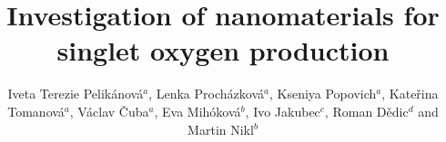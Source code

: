 \begin{frontmatter}



\title{Investigation of nanomaterials for singlet oxygen production}


\author{Iveta Terezie Pelikánová$^{a}$, Lenka Procházková$^{a}$, Kseniya Popovich$^{a}$, Kateřina Tomanová$^{a}$, Václav Čuba$^{a}$, Eva Mihóková$^{b}$, Ivo Jakubec$^{c}$, Roman Dědic$^{d}$ and Martin Nikl$^{b}$}

\address{
    $^{a}$Department of Nuclear Chemistry, Faculty of Nuclear Sciences and Physical Engineering, Czech Technical University in Prague, Břehová 7, Prague 115 19, Czech Republic\\ 
    $^{b}$Department of Optical Materials, Institute of Physics of the Czech Academy of Sciences, Cukrovarnická 10, Prague 162 53, Czech Republic\\
    $^{c}$Institute of Inorganic Chemistry of the Czech Academy of Sciences, Husinec-Řež 1001, Řež 250 68, Czech Republic\\
    $^{d}$Charles University, Faculty of Math and Physics, Ke Karlovu 3, 121 16, Prague, Czech Republic}



\end{frontmatter}
